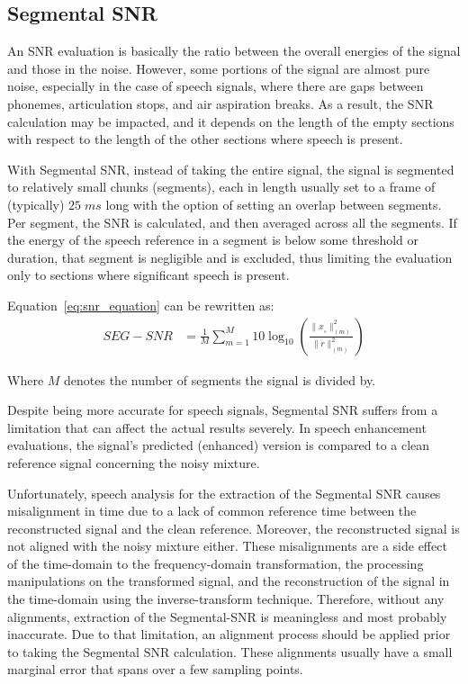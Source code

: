 \subsection{Segmental SNR}
An SNR evaluation is basically the ratio between the overall 
energies of the signal and those in the noise. 
However, some portions of the signal are almost pure noise, 
especially in the case of speech signals, 
where there are gaps between phonemes, 
articulation stops, and air aspiration breaks. As a result,
the SNR calculation may be impacted, and
it depends on
the length of the empty sections with respect 
to the length of
the other sections where speech is present.

With Segmental SNR\cite{10.5555/912256}, 
instead of taking the entire signal,
the signal is segmented to relatively small chunks (segments), 
each in length usually set to a frame of (typically) \(25\;ms\) long
with the option of setting an overlap
between segments.
Per segment, the SNR is calculated, and then averaged across
all the segments.
If the energy of the speech reference 
in a segment is below some threshold or duration,
that segment is negligible and is excluded,
thus limiting the evaluation only to sections 
where significant speech is present. 


Equation~\ref{eq:snr_equation} can be rewritten as:
\begin{align}
    SEG-SNR & = \frac{1}{M}\sum_{m=1}^{M}
                10\log_{10} 
                \left(
                    \frac{ \| x_{_{s}} \|^{2}_{(m)}}{\| r \|^{2}_{(m)}} 
                \right)
\end{align}

Where \(M\) denotes the number of segments the signal is divided by.


Despite being more accurate for speech signals, Segmental SNR 
suffers from a limitation that can affect the actual results severely. 
In speech enhancement evaluations, the signal's predicted (enhanced) version is 
compared to a clean reference signal 
concerning the noisy mixture.

Unfortunately, speech analysis for the extraction of
the Segmental SNR causes misalignment in time 
due to a lack of common reference time between 
the reconstructed signal and the clean reference.
Moreover, the reconstructed signal is not aligned 
with the noisy mixture either. 
These misalignments 
are a side effect of the time-domain 
to the frequency-domain transformation, 
the processing manipulations on the transformed signal, 
and the reconstruction of the signal in 
the time-domain using the inverse-transform technique. 
Therefore, without any alignments, extraction of the Segmental-SNR
is meaningless and most probably inaccurate. 
Due to that limitation, an alignment process should be applied
prior to taking the Segmental SNR calculation. These alignments usually 
have a small marginal error that spans over a few sampling points.

